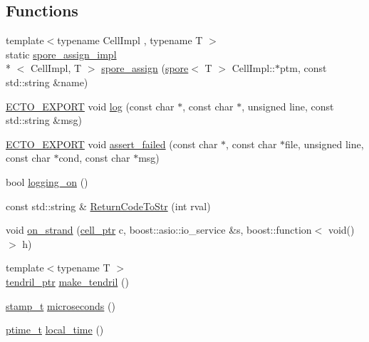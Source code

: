 \subsection*{Functions}
\begin{DoxyCompactItemize}
\item 
{\footnotesize template$<$typename Cell\-Impl , typename T $>$ }\\static \hyperlink{structecto_1_1spore__assign__impl}{spore\-\_\-assign\-\_\-impl}\\*
$<$ Cell\-Impl, T $>$ \hyperlink{namespaceecto_a776138cb830340922312c3ec98c15b6d}{spore\-\_\-assign} (\hyperlink{structecto_1_1spore}{spore}$<$ T $>$ Cell\-Impl\-::$\ast$ptm, const std\-::string \&name)
\item 
\hyperlink{util_8hpp_ab55b7868679cda60fc162580957fb98c}{E\-C\-T\-O\-\_\-\-E\-X\-P\-O\-R\-T} void \hyperlink{namespaceecto_a3870bebbdf6a0d01f28424e402be2834}{log} (const char $\ast$, const char $\ast$, unsigned line, const std\-::string \&msg)
\item 
\hyperlink{util_8hpp_ab55b7868679cda60fc162580957fb98c}{E\-C\-T\-O\-\_\-\-E\-X\-P\-O\-R\-T} void \hyperlink{namespaceecto_af79493e380ac31e886186e2ba1a1b809}{assert\-\_\-failed} (const char $\ast$, const char $\ast$file, unsigned line, const char $\ast$cond, const char $\ast$msg)
\item 
bool \hyperlink{namespaceecto_a34c1f436c47dc08392c8248632cde6f0}{logging\-\_\-on} ()
\item 
const std\-::string \& \hyperlink{namespaceecto_a00786d16020c07e60fea08e8352dba30}{Return\-Code\-To\-Str} (int rval)
\item 
void \hyperlink{namespaceecto_a653dab75b6cd892233b9f3676a5d2921}{on\-\_\-strand} (\hyperlink{namespaceecto_aed1809e82b9229ea81ef9ee3438cf62c}{cell\-\_\-ptr} c, boost\-::asio\-::io\-\_\-service \&s, boost\-::function$<$ void()$>$ h)
\item 
{\footnotesize template$<$typename T $>$ }\\\hyperlink{namespaceecto_a84fb5f6130275382e5cbeb5fdececa78}{tendril\-\_\-ptr} \hyperlink{namespaceecto_af284ea4dc605a1d2e037731e5f35eeaa}{make\-\_\-tendril} ()
\item 
\hyperlink{namespaceecto_a96ba8fa498cc4b8e2a0217a9e236b50d}{stamp\-\_\-t} \hyperlink{namespaceecto_af5e1929b12d596f7cc45a3fe7c76c5ed}{microseconds} ()
\item 
\hyperlink{namespaceecto_a5bbe8fb0da047cb18d92eb9dfb469652}{ptime\-\_\-t} \hyperlink{namespaceecto_a67829007171203782a69bde851cb1dc6}{local\-\_\-time} ()

\end{DoxyCompactItemize}
